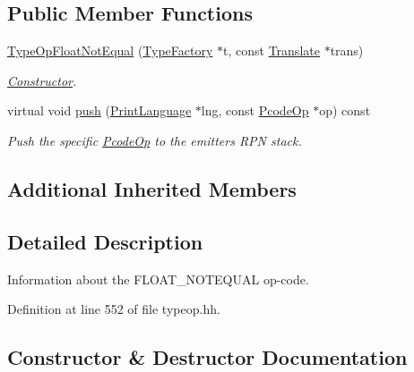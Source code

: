 \subsection*{Public Member Functions}
\begin{DoxyCompactItemize}
\item 
\mbox{\hyperlink{class_type_op_float_not_equal_a8f748f056b1a175b49d89370f6c51008}{Type\+Op\+Float\+Not\+Equal}} (\mbox{\hyperlink{class_type_factory}{Type\+Factory}} $\ast$t, const \mbox{\hyperlink{class_translate}{Translate}} $\ast$trans)
\begin{DoxyCompactList}\small\item\em \mbox{\hyperlink{class_constructor}{Constructor}}. \end{DoxyCompactList}\item 
virtual void \mbox{\hyperlink{class_type_op_float_not_equal_a0245e015f66e8d6101416fdb0b796dd4}{push}} (\mbox{\hyperlink{class_print_language}{Print\+Language}} $\ast$lng, const \mbox{\hyperlink{class_pcode_op}{Pcode\+Op}} $\ast$op) const
\begin{DoxyCompactList}\small\item\em Push the specific \mbox{\hyperlink{class_pcode_op}{Pcode\+Op}} to the emitter\textquotesingle{}s R\+PN stack. \end{DoxyCompactList}\end{DoxyCompactItemize}
\subsection*{Additional Inherited Members}


\subsection{Detailed Description}
Information about the F\+L\+O\+A\+T\+\_\+\+N\+O\+T\+E\+Q\+U\+AL op-\/code. 

Definition at line 552 of file typeop.\+hh.



\subsection{Constructor \& Destructor Documentation}
\mbox{\label{class_type_op_float_not_equal_a8f748f056b1a175b49d89370f6c51008}} 
